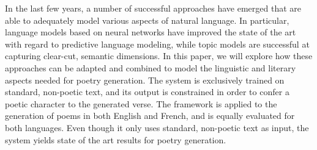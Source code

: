 In the last few years, a number of successful approaches have emerged that are able to adequately model various aspects of natural language. In particular, language models based on neural networks have improved the state of the art with regard to predictive language modeling, while topic models are successful at capturing clear-cut, semantic dimensions. In this paper, we will explore how these approaches can be adapted and combined to model the linguistic and literary aspects needed for poetry generation. The system is exclusively trained on standard, non-poetic text, and its output is constrained in order to confer a poetic character to the generated verse. The framework is applied to the generation of poems in both English and French, and is equally evaluated for both languages. Even though it only uses standard, non-poetic text as input, the system yields state of the art results for poetry generation.
